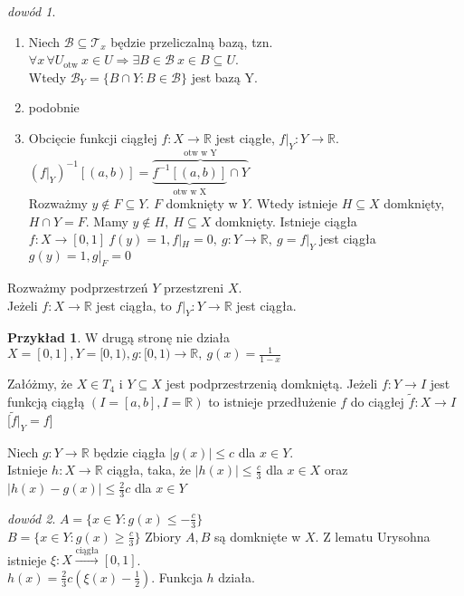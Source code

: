 \documentclass[twoside,10pt]{article}
\theoremstyle{definition}
\theoremstyle{definition}
\theoremstyle{definition}
\theoremstyle{definition}
\theoremstyle{remark}
\newtheorem*{dd}{dowód}
\theoremstyle{definition}
\theoremstyle{definition}
\theoremstyle{definition}
\theoremstyle{definition}
\newtheorem*{prz}{Przykład}
\theoremstyle{definition}
\theoremstyle{definition}
\begin{document}
\begin{dd} 
    \begin{enumerate}[(1)] \hfill
        \item Niech $\mathcal B \subseteq \mathcal T_x$ będzie przeliczalną bazą, tzn. $\forall x \, \forall U_{\text{otw}} 
        \ x \in U \Rightarrow \exists B \in \mathcal B \ x \in B \subseteq U$. \\ 
        Wtedy $\mathcal B_Y = \{ B \cap Y : B \in \mathcal B\}$ jest bazą Y. 
        \item podobnie
        \item Obcięcie funkcji ciągłej $f: X \to \mathbb R$ jest ciągłe, $f|_Y : Y \to \mathbb R$. \\ 
        $(f|_Y)^{-1} [(a,b)] = \overbrace{\underbrace{f^{-1} [(a,b)]}_{\text{otw w X}} \cap Y}^{\text{otw w Y}}$\\
        Rozważmy $y \notin F \subseteq Y$. $F$ domknięty w $Y$. Wtedy istnieje $H \subseteq X$ domknięty, 
        $H \cap Y = F$. Mamy $y \notin H,\ H \subseteq X$ domknięty. Istnieje ciągła $f: X \to [0,1] \ f(y) = 1,
        f|_H = 0, \ g: Y \to \mathbb R,\ g = f|_Y$ jest ciągła $g(y) = 1,g|_F = 0$
    \end{enumerate} 
\end{dd} 
Rozważmy podprzestrzeń $Y$ przestzreni $X$. \\ 
Jeżeli $f: X \to \mathbb R$ jest ciągła, to $f|_Y: Y \to \mathbb R$ jest ciągła.
\begin{prz}  W drugą stronę nie działa
    $X = [0,1], Y = [0,1), g: [0,1) \to \mathbb R, \ g(x) = \frac{1}{1-x}$
\end{prz} 
\begin{tw}[Tietze'go]
    Załóżmy, że $X \in T_4$ i $Y \subseteq X$ jest podprzestrzenią domkniętą. Jeżeli $f: Y \to I$ jest funkcją
    ciągłą $(I = [a,b], I = \mathbb R)$ to istnieje przedłużenie $f$ do ciągłej $\widetilde f : X \to I$
    [$\widetilde f |_Y = f$]
\end{tw} 
\begin{lem} 
    Niech $g: Y \to \mathbb R$ będzie ciągła $|g(x)| \le c$ dla $x \in Y$. \\ 
    Istnieje $h: X \to \mathbb R$ ciągła, taka, że $|h(x)| \le \frac{c}{3}$ dla $x \in X$ oraz $|h(x) - g(x)| 
    \le \frac{2}{3}c$ dla $x \in Y$
    \begin{dd} 
        $A = \{ x \in Y: g(x) \le -\frac{c}{3} \}$\\
        $B = \{ x \in Y: g(x) \ge \frac{c}{3} \}$ 
        Zbiory $A, B$ są domknięte w $X$. Z lematu Urysohna istnieje $\xi: X \xrightarrow{\text{ciągła}} [0,1]$.\\
        $h(x) = \frac{2}{3} c (\xi (x) - \frac{1}{2})$. Funkcja $h$ działa. 
    \end{dd} 
\end{lem} 
\end{document}
